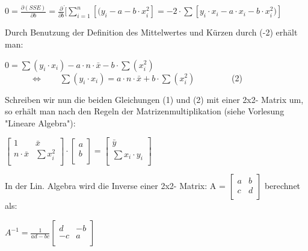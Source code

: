 \documentclass[12pt]{article}
\begin{document}
\begin{center}
\begin{large} 
$ 0 = \frac{\partial (SSE)}{\partial b } = \frac{\partial}{\partial b} \dot  [\sum\limits_{i=1}^n [(y_i - a -b \cdot x_i^2] = -2 \cdot \sum[y_i \cdot x_i - a \cdot x_i - b \cdot x_i^2)] $
\end{large}
\end{center}
%
Durch Benutzung der Definition des Mittelwertes und Kürzen durch (-2) erhält man:  
 
\begin{center}
$ 0 = \sum(y_i \cdot x_i) - a \cdot n \cdot \bar{x} - b \cdot \sum(x_i^2) $ \\[0.4cm]  
$ \quad\quad\quad \Leftrightarrow \qquad \sum(y_i \cdot x_i) =  a \cdot n \cdot \bar{x} + b \cdot \sum(x_i^2)\qquad\qquad  $ (2) \\[0.3cm]
\end{center}
%
Schreiben wir nun die beiden Gleichungen (1) und (2) mit einer 2x2- Matrix um, so erhält man nach den Regeln der Matrizenmultiplikation (siehe Vorlesung "Lineare Algebra"):\\[0.2cm]  
\begin{center}
\begin{large} 
$ \begin{bmatrix} 1 & \bar{x} \\ n \cdot \bar{x} & \sum{x_i^2} \\ \end{bmatrix} \cdot                                                                                                  \begin{bmatrix} a \\ b \\ \end{bmatrix} = \begin{bmatrix} \bar{y} \\ \sum{x_i \cdot y_i}  \\ \end{bmatrix} $
\end{large}
\end{center}
%
In der Lin. Algebra wird die Inverse einer 2x2- Matrix:    
A = $ \begin{bmatrix} a & b \\ c & d \\ \end{bmatrix} $ berechnet als: 
\begin{center}
\begin{large} 
$ A^{-1} = \frac{1}{ad - bc} \begin{bmatrix}
d & -b \\
-c & a \\
\end{bmatrix} $
\end{large}
\end{center} 
\end{document}
